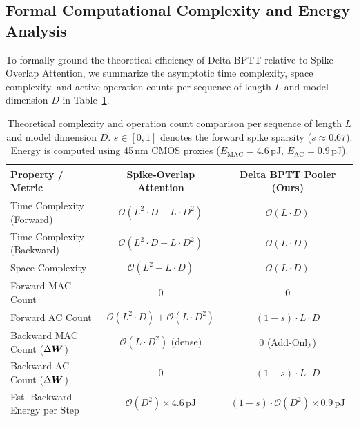 \documentclass[11pt, conference, compsoc, twoside]{IEEEtran}
\begin{document}
\subsection{Formal Computational Complexity and Energy Analysis}
To formally ground the theoretical efficiency of Delta BPTT relative to Spike-Overlap Attention, we summarize the asymptotic time complexity, space complexity, and active operation counts per sequence of length $L$ and model dimension $D$ in Table~\ref{tab:complexity}.

\begin{table}[t]
\begin{center}
{\caption{Theoretical complexity and operation count comparison per sequence of length $L$ and model dimension $D$. $s \in [0,1]$ denotes the forward spike sparsity ($s \approx 0.67$). Energy is computed using 45\,nm CMOS proxies ($E_{\text{MAC}} = 4.6$\,pJ, $E_{\text{AC}} = 0.9$\,pJ).}\label{tab:complexity}}


\begin{tabular}{lcc}
\toprule
\textbf{Property / Metric} & \textbf{Spike-Overlap Attention} & \textbf{Delta BPTT Pooler (Ours)} \\
\midrule
Time Complexity (Forward) & $\mathcal{O}(L^2 \cdot D + L \cdot D^2)$ & $\mathcal{O}(L \cdot D)$ \\
Time Complexity (Backward) & $\mathcal{O}(L^2 \cdot D + L \cdot D^2)$ & $\mathcal{O}(L \cdot D)$ \\
Space Complexity & $\mathcal{O}(L^2 + L \cdot D)$ & $\mathcal{O}(L \cdot D)$ \\
Forward MAC Count & $0$ & $0$ \\
Forward AC Count & $\mathcal{O}(L^2 \cdot D) + \mathcal{O}(L \cdot D^2)$ & $(1-s) \cdot L \cdot D$ \\
Backward MAC Count ($\Delta \boldsymbol{W}$) & $\mathcal{O}(L \cdot D^2)$ (dense) & $0$ (Add-Only) \\
Backward AC Count ($\Delta \boldsymbol{W}$) & $0$ & $(1-s) \cdot L \cdot D$ \\
\midrule
Est. Backward Energy per Step & $\mathcal{O}(D^2) \times 4.6\,\text{pJ}$ & $(1-s) \cdot \mathcal{O}(D^2) \times 0.9\,\text{pJ}$ \\
\bottomrule
\end{tabular}
\end{center}
\end{table}
\end{document}
